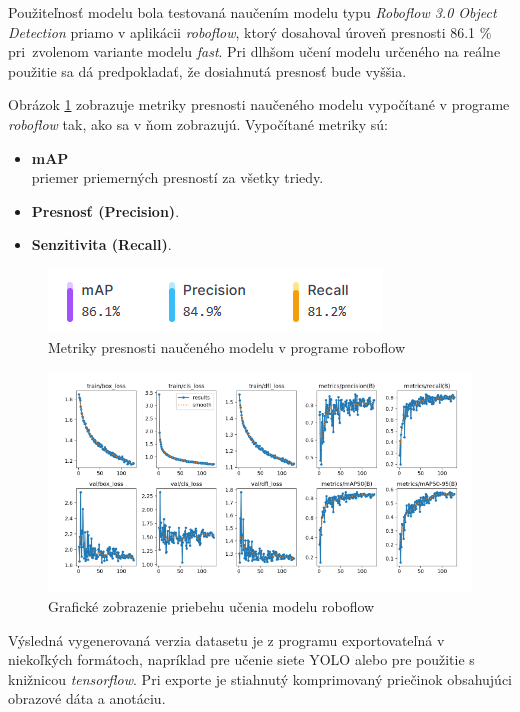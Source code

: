     Použiteľnosť modelu bola testovaná naučením modelu typu \emph{Roboflow 3.0 Object Detection} priamo v aplikácii \emph{roboflow}, ktorý dosahoval úroveň presnosti 86.1 \% pri~zvolenom variante modelu \emph{fast}. Pri dlhšom učení modelu určeného na reálne použitie sa dá predpokladať, že dosiahnutá presnosť bude vyššia.

    Obrázok \ref{fig:roboflow_metrics} zobrazuje metriky presnosti naučeného modelu vypočítané v programe \emph{roboflow} tak, ako sa v ňom zobrazujú. Vypočítané metriky sú:

    \begin{itemize}
        \item \textbf{\ac{mAP}} \\ priemer priemerných presností za všetky triedy.
        \item \textbf{Presnosť (Precision)}.
        \item \textbf{Senzitivita (Recall)}.
    \end{itemize}

    \begin{figure}[H]
        \centering
        \includegraphics[width=.35\textwidth]{obrazky/roboflow/metrics.png}
        \caption{Metriky presnosti naučeného modelu v programe roboflow}
        \label{fig:roboflow_metrics}
    \end{figure}

    \begin{figure}[H]
        \centering
        \includegraphics[width=.8\textwidth]{obrazky/roboflow/train.png}
        \caption{Grafické zobrazenie priebehu učenia modelu roboflow}
    \end{figure}

    Výsledná vygenerovaná verzia datasetu je z programu exportovateľná v niekoľkých formátoch, napríklad pre učenie siete \ac{YOLO} alebo pre použitie s knižnicou \emph{tensorflow}. Pri exporte je stiahnutý komprimovaný priečinok obsahujúci obrazové dáta a anotáciu.


